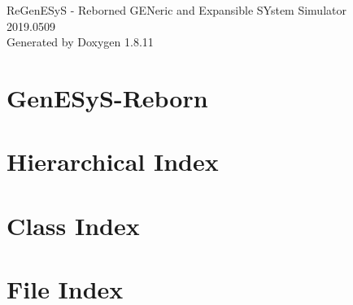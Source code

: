 \documentclass[twoside]{book}
\newcommand{\+}{\discretionary{\mbox{\scriptsize$\hookleftarrow$}}{}{}}
\newcommand{\clearemptydoublepage}{%
  \newpage{\pagestyle{empty}\cleardoublepage}%
}
\begin{document}
\hypersetup{pageanchor=false,
             bookmarksnumbered=true,
             pdfencoding=unicode
            }
\begin{titlepage}
\vspace*{7cm}
\begin{center}%
{\Large Re\+Gen\+E\+SyS -\/ Reborned G\+E\+Neric and Expansible S\+Ystem Simulator \\[1ex]\large 2019.\+0509 }\\
\vspace*{1cm}
{\large Generated by Doxygen 1.8.11}\\
\end{center}
\end{titlepage}
\clearemptydoublepage
\tableofcontents
\clearemptydoublepage
{}
\hypersetup{pageanchor=true}

\chapter{Gen\+E\+Sy\+S-\/\+Reborn}
\label{md_README}
\hypertarget{md_README}{}

\chapter{Hierarchical Index}

\chapter{Class Index}

\chapter{File Index}

\end{document}
